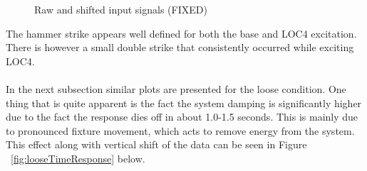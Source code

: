 \documentclass[paper=a4, fontsize=12pt]{scrartcl} %
\begin{document}
%
	\begin{figure}[H]
		\centering
		\quad
		\caption{Raw and shifted input signals (FIXED)}
		\label{fig:weightInputResponse}
	\end{figure}
%
The hammer strike appears well defined for both the base and LOC4 excitation. There is however a small double strike that consistently occurred while exciting LOC4.
\\
\\
In the next subsection similar plots are presented for the loose condition. One thing that is quite apparent is the fact the system damping is significantly higher due to the fact the response dies off in about 1.0-1.5 seconds. This is mainly due to pronounced fixture movement, which acts to remove energy from the system. This effect along with vertical shift of the data can be seen in Figure ~\ref{fig:looseTimeResponse} below.
%
\end{document}
